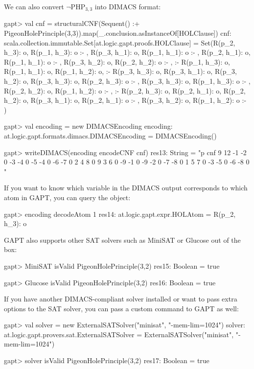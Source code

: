 \documentclass[a4paper,11pt]{article}
\newcommand{\cli}[1]{{\ttfamily {#1}}}
\begin{document}
We can also convert $\neg\mathrm{PHP}_{3,3}$ into DIMACS format:
\begin{clilisting}
gapt> val cnf = structuralCNF(Sequent() :+ PigeonHolePrinciple(3,3)).map(_.conclusion.asInstanceOf[HOLClause])
cnf: scala.collection.immutable.Set[at.logic.gapt.proofs.HOLClause] = Set(R(p_2, h_3): o, R(p_1, h_3): o :- , R(p_3, h_1): o, R(p_1, h_1): o :- , R(p_2, h_1): o, R(p_1, h_1): o :- , R(p_3, h_2): o, R(p_2, h_2): o :- ,  :- R(p_1, h_3): o, R(p_1, h_1): o, R(p_1, h_2): o,  :- R(p_3, h_3): o, R(p_3, h_1): o, R(p_3, h_2): o, R(p_3, h_3): o, R(p_2, h_3): o :- , R(p_3, h_3): o, R(p_1, h_3): o :- , R(p_2, h_2): o, R(p_1, h_2): o :- ,  :- R(p_2, h_3): o, R(p_2, h_1): o, R(p_2, h_2): o, R(p_3, h_1): o, R(p_2, h_1): o :- , R(p_3, h_2): o, R(p_1, h_2): o :- )

gapt> val encoding = new DIMACSEncoding
encoding: at.logic.gapt.formats.dimacs.DIMACSEncoding = DIMACSEncoding()

gapt> writeDIMACS(encoding encodeCNF cnf)
res13: String =
"p cnf 9 12
-1 -2 0
-3 -4 0
-5 -4 0
-6 -7 0
2 4 8 0
9 3 6 0
-9 -1 0
-9 -2 0
-7 -8 0
1 5 7 0
-3 -5 0
-6 -8 0
"

\end{clilisting}

If you want to know which variable in the DIMACS output corresponds to which
atom in GAPT, you can query the \cli{DIMACSEncoding} object:
\begin{clilisting}
gapt> encoding decodeAtom 1
res14: at.logic.gapt.expr.HOLAtom = R(p_2, h_3): o

\end{clilisting}

GAPT also supports other SAT solvers such as MiniSAT or Glucose out of the box:
\begin{clilisting}
gapt> MiniSAT isValid PigeonHolePrinciple(3,2)
res15: Boolean = true

\end{clilisting}
\begin{clilisting}
gapt> Glucose isValid PigeonHolePrinciple(3,2)
res16: Boolean = true

\end{clilisting}

If you have another DIMACS-compliant solver installed or want to pass extra
options to the SAT solver, you can pass a custom command to GAPT as well:
\begin{clilisting}
gapt> val solver = new ExternalSATSolver("minisat", "-mem-lim=1024")
solver: at.logic.gapt.provers.sat.ExternalSATSolver = ExternalSATSolver("minisat", "-mem-lim=1024")

gapt> solver isValid PigeonHolePrinciple(3,2)
res17: Boolean = true

\end{clilisting}
\end{document}
